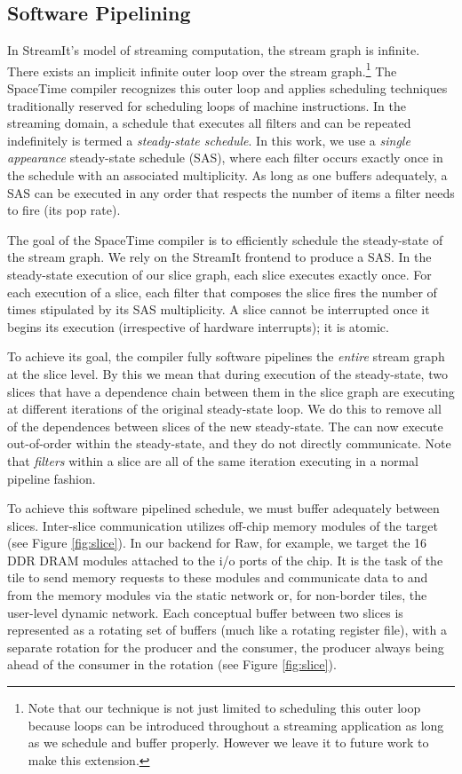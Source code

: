 \subsection{Software Pipelining}
\label{sec:softpipe}
In StreamIt's model of streaming computation, the stream graph is
infinite.  There exists an implicit infinite outer loop over the
stream graph.\footnote{Note that our technique is not just limited to
scheduling this outer loop because loops can be introduced throughout
a streaming application as long as we schedule and buffer properly.
However we leave it to future work to make this extension.}  The
SpaceTime compiler recognizes this outer loop and applies scheduling
techniques traditionally reserved for scheduling loops of machine
instructions.  In the streaming domain, a schedule that executes all
filters and can be repeated indefinitely is termed a {\it steady-state
schedule}.  In this work, we use a {\it single appearance}
steady-state schedule (SAS), where each filter occurs exactly once in
the schedule with an associated multiplicity.  As long as one buffers
adequately, a SAS can be executed in any order that respects the
number of items a filter needs to fire (its pop rate).

The goal of the SpaceTime compiler is to efficiently schedule the
steady-state of the stream graph.  We rely on the StreamIt frontend to
produce a SAS.  In the steady-state execution of our slice graph, each
slice executes exactly once. For each execution of a slice, each
filter that composes the slice fires the number of times stipulated by
its SAS multiplicity.  A slice cannot be interrupted once it begins
its execution (irrespective of hardware interrupts); it is atomic.

To achieve its goal, the compiler fully software pipelines the {\it
entire} stream graph at the slice level. By this we mean that during
execution of the steady-state, two slices that have a dependence chain
between them in the slice graph are executing at different iterations
of the original steady-state loop.  We do this to remove all of the
dependences between slices of the new steady-state.  The can now
execute out-of-order within the steady-state, and they do not directly
communicate.  Note that {\it filters} within a slice are all of the
same iteration executing in a normal pipeline fashion.

To achieve this software pipelined schedule, we must buffer adequately
between slices.  Inter-slice communication utilizes off-chip memory
modules of the target (see Figure \ref{fig:slice}).  In our backend
for Raw, for example, we target the 16 DDR DRAM modules attached to
the i/o ports of the chip.  It is the task of the tile to send memory
requests to these modules and communicate data to and from the memory
modules via the static network or, for non-border tiles, the
user-level dynamic network.  Each conceptual buffer between two slices
is represented as a rotating set of buffers (much like a rotating
register file), with a separate rotation for the producer and the
consumer, the producer always being ahead of the consumer in the
rotation (see Figure \ref{fig:slice}).

